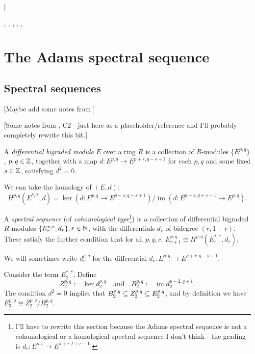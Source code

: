 \documentclass{MetricNotes2023}
\def\subq{\ensuremath\subseteq}
\def\inte{\ensuremath\mathbb{Z}}
\def\nat{\ensuremath\mathbb{N}}
\DeclareMathOperator{\im}{im}
\begin{document}
]

\autocite{stable_homotopy}, \autocite{cobordism}, \autocite{ass}, \autocite{spectra}, \autocite{foundations}, \autocite{hatcher5}

\section{The Adams spectral sequence}

\subsection{Spectral sequences}

[Maybe add some notes from \autocite{ass}]

[Some notes from \autocite{spectral_sequences}, C2 - just here as a placeholder/reference and I'll probably completely rewrite this bit.]

\begin{definition}
A \textit{differential bigraded module} \(E\) over a ring \(R\) is a collection of \(R\)-modules \(\{E^{p, q}\}\), \(p, q\in \inte\), together with a map \(d : E^{p, q} \to E^{p+s, q-s+1}\) for each \(p, q\) and some fixed \(s \in \inte\), satisfying \(d^2=0\). 
\end{definition}

We can take the homology of \((E, d)\):
\[H^{p, q}(E^{*, *}, d)=\ker(d : E^{p, q}\to E^{p+s, q-s+1})/\im(d : E^{p-s, q+s-1}\to E^{p, q}).\]

\begin{definition}
A \textit{spectral sequence} (of \textit{cohomological type}\footnote{I'll have to rewrite this section because the Adams spectral sequence is not a cohomological or a homological spectral sequence I don't think - the grading is \(d_r : E^{s,t}\to E^{s+r,t+r-1}\).}) is a collection of differential bigraded \(R\)-modules \(\{E^{*, *}_r, d_r\}, r \in \nat\), with the differentials \(d_r\) of bidegree \((r, 1-r)\). These satisfy the further condition that for all \(p, q, r\), \(E^{p, q}_{r+1}\cong H^{p, q}(E_r^{*, *}, d_r)\).
\end{definition}

We will sometimes write \(d^{p, q}_r\) for the differential \(d_r : E^{p, q}\to E^{p+r,q-s+1}\). 

Consider the term \(E_2^{*, *}\). Define 
\[Z_2^{p, q}:=\ker d_2^{p,q} \quad \text{and} \quad B_2^{p,q}:=\im d_2^{p-2,q+1}.\]
The condition \(d^2=0\) implies that \(B_2^{p,q}\subq Z_2^{p,q}\subq E_2^{p,q}\), and by definition we have \(E_3^{p,q}\cong Z^{p,q}_2/B_2^{p,q}\). 
\end{document}
